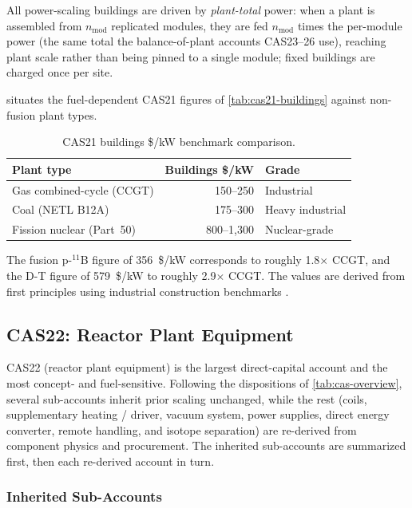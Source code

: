 \documentclass{article}
\begin{document}
All power-scaling buildings are driven by \emph{plant-total} power: when a
plant is assembled from $n_{\text{mod}}$ replicated modules, they are fed
$n_{\text{mod}}$ times the per-module power (the same total the
balance-of-plant accounts CAS23--26 use), reaching plant scale rather than
being pinned to a single module; fixed buildings are charged once per site.

 situates the fuel-dependent CAS21 figures
of \cref{tab:cas21-buildings} against non-fusion plant types.

\begin{table}[htbp]
\caption{CAS21 buildings \$/kW benchmark comparison.}
\label{tab:cas21-benchmarks}
\centering
\begin{tabular}{lrl}
\toprule
Plant type & Buildings \$/kW & Grade \\
\midrule
Gas combined-cycle (CCGT) & 150--250 & Industrial \\
Coal (NETL B12A) & 175--300 & Heavy industrial \\
Fission nuclear (Part~50) & 800--1{,}300 & Nuclear-grade \\
\bottomrule
\end{tabular}
\end{table}

The fusion p-${}^{11}$B figure of 356~\$/kW corresponds to roughly
1.8$\times$ CCGT, and the D-T figure of 579~\$/kW to roughly
2.9$\times$ CCGT.
The values are derived from first principles using industrial construction
benchmarks \citep{cushman_wakefield_2025, netl2022, nrel_atb2024}.


\subsection{CAS22: Reactor Plant Equipment}
\label{sec:cas22}

CAS22 (reactor plant equipment) is the largest direct-capital account and
the most concept- and fuel-sensitive. Following the dispositions of
\cref{tab:cas-overview}, several sub-accounts inherit prior scaling
unchanged, while the rest (coils, supplementary heating / driver, vacuum
system, power supplies, direct energy converter, remote handling, and
isotope separation) are re-derived from component physics and procurement.
The inherited sub-accounts are summarized first, then each re-derived
account in turn.

\subsubsection{Inherited Sub-Accounts}
\label{sec:cas22-inherited}
\end{document}
